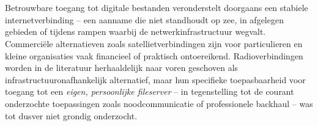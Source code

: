 
%
%
%
%
%

%



\chapter*{}

Betrouwbare toegang tot digitale bestanden veronderstelt doorgaans een stabiele
internetverbinding -- een aanname die niet standhoudt op zee, in afgelegen gebieden of
tijdens rampen waarbij de netwerkinfrastructuur wegvalt. Commerciële alternatieven zoals
satellietverbindingen zijn voor particulieren en kleine organisaties vaak financieel of
praktisch ontoereikend. Radioverbindingen worden in de literatuur herhaaldelijk naar
voren geschoven als infrastructuuronafhankelijk alternatief, maar hun specifieke
toepasbaarheid voor toegang tot een \emph{eigen, persoonlijke fileserver} -- in
tegenstelling tot de courant onderzochte toepassingen zoals noodcommunicatie of
professionele backhaul -- was tot dusver niet grondig onderzocht.
 
